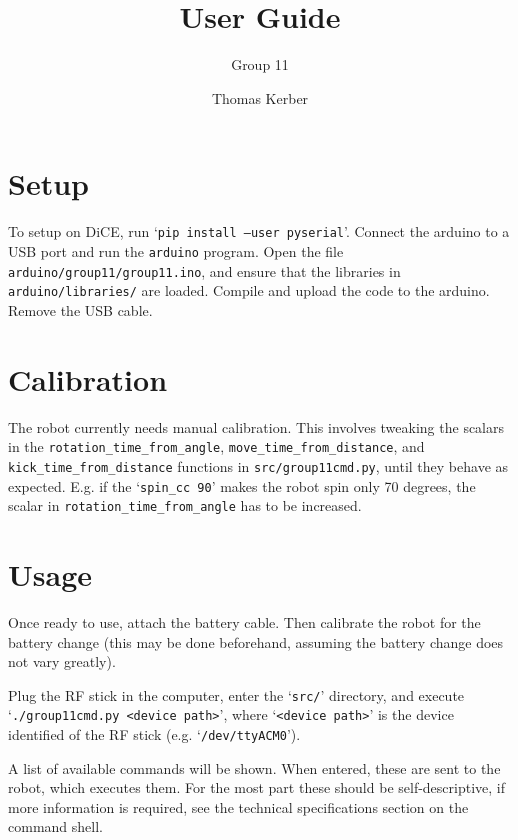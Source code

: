 \documentclass[a4paper]{scrartcl}
\author{Thomas Kerber}
\title{User Guide}
\subtitle{Group 11}
\begin{document}
\maketitle
\section{Setup}

To setup on DiCE, run `\texttt{pip install --user pyserial}'. Connect the
arduino to a USB port and run the \texttt{arduino} program. Open the file
\verb$arduino/group11/group11.ino$, and ensure that the libraries in
\verb$arduino/libraries/$ are loaded. Compile and upload the code to the
arduino. Remove the USB cable.

\section{Calibration}

The robot currently needs manual calibration. This involves tweaking the
scalars in the \texttt{rotation\_time\_from\_angle},
\texttt{move\_time\_from\_distance}, and \texttt{kick\_time\_from\_distance}
functions in \verb$src/group11cmd.py$, until they behave as expected. E.g. if
the `\texttt{spin\_cc 90}' makes the robot spin only 70 degrees, the scalar in
\texttt{rotation\_time\_from\_angle} has to be increased.

\section{Usage}

Once ready to use, attach the battery cable. Then calibrate the robot for the
battery change (this may be done beforehand, assuming the battery change does
not vary greatly).

Plug the RF stick in the computer, enter the `\verb$src/$' directory, and
execute `\texttt{./group11cmd.py <device path>}', where `\texttt{<device
path>}' is the device identified of the RF stick (e.g. `\verb$/dev/ttyACM0$').

A list of available commands will be shown. When entered, these are sent to the
robot, which executes them. For the most part these should be self-descriptive,
if more information is required, see the technical specifications section on
the command shell.


\end{document}
